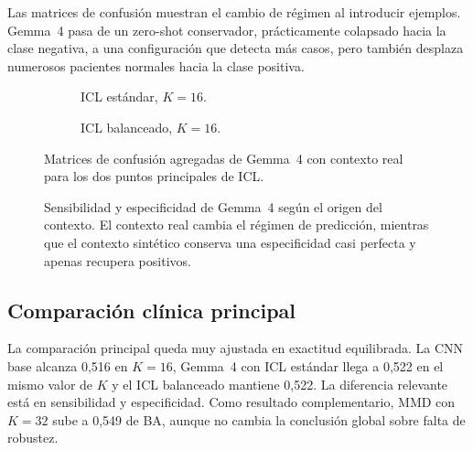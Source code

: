 Las matrices de confusión muestran el cambio de régimen al introducir ejemplos. Gemma~4 pasa de un zero-shot conservador, prácticamente colapsado hacia la clase negativa, a una configuración que detecta más casos, pero también desplaza numerosos pacientes normales hacia la clase positiva.

\begin{figure}[H]
  \centering
  \begin{subfigure}{0.42\textwidth}
    \centering
    \caption{ICL estándar, \(K=16\).}
  \end{subfigure}
  \hfill
  \begin{subfigure}{0.42\textwidth}
    \centering
    \caption{ICL balanceado, \(K=16\).}
  \end{subfigure}
  \caption{Matrices de confusión agregadas de Gemma~4 con contexto real para los dos puntos principales de ICL.}
  \label{fig:vlm_huca_confusions}
\end{figure}

\begin{figure}[H]
  \centering
  \caption{Sensibilidad y especificidad de Gemma~4 según el origen del contexto. El contexto real cambia el régimen de predicción, mientras que el contexto sintético conserva una especificidad casi perfecta y apenas recupera positivos.}
  \label{fig:vlm_huca_context_transfer}
\end{figure}

\subsection{Comparación clínica principal}

La comparación principal queda muy ajustada en exactitud equilibrada. La CNN base alcanza 0,516 en \(K=16\), Gemma~4 con ICL estándar llega a 0,522 en el mismo valor de \(K\) y el ICL balanceado mantiene 0,522. La diferencia relevante está en sensibilidad y especificidad. Como resultado complementario, MMD con \(K=32\) sube a 0,549 de BA, aunque no cambia la conclusión global sobre falta de robustez.

